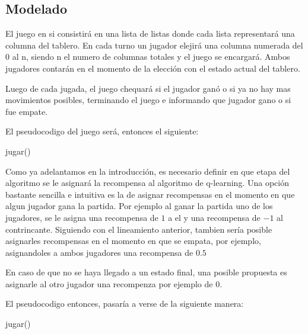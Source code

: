 \subsection{Modelado}
El juego en si consistirá en una lista de listas donde cada lista representará una columna del tablero. En cada turno un jugador elejirá una columna numerada del 0 al n, siendo n el numero de columnas totales y el juego se encargará. Ambos jugadores contarán en el momento de la elección con el estado actual del tablero.

Luego de cada jugada, el juego chequará si el jugador ganó o si ya no hay mas movimientos posibles, terminando el juego e informando que jugador gano o si fue empate.

El pseudocodigo del juego será, entonces el siguiente:

\begin{algorithm}[h!]
\begin{algorithmic}[1]\parskip=1mm
 \caption{jugar()}
\end{algorithmic}
\end{algorithm}

Como ya adelantamos en la introducción, es necesario definir en que etapa del algoritmo se le asignará la recompensa al algoritmo de q-learning. Una opción bastante sencilla e intuitiva es la de asignar recompensas en el momento en que algun jugador gana la partida. Por ejemplo al ganar la partida uno de los jugadores, se le asigna una recompensa de $1$ a el y una recompensa de $-1$ al contrincante. Siguiendo con el lineamiento anterior, tambien sería posible asignarles recompensas en el momento en que se empata, por ejemplo, asignandoles a ambos jugadores una recompensa de $0.5$

En caso de que no se haya llegado a un estado final, una posible propuesta es asignarle al otro jugador una recompenza por ejemplo de 0.

El pseudocodigo entonces, pasaría a verse de la siguiente manera:

\begin{algorithm}[h!]
\begin{algorithmic}[1]\parskip=1mm
 \caption{jugar()}
\end{algorithmic}
\end{algorithm}

